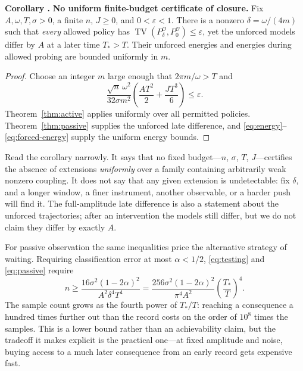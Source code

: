\documentclass[10pt]{article}
\newcounter{claim}
\newcommand{\claim}[2]{\refstepcounter{claim}\label{#1}\textbf{#2 \theclaim.}}
\newcommand{\TV}{\operatorname{TV}}
\newcommand{\eps}{\varepsilon}
\newcommand{\obs}{\mathcal O}
\begin{document}
\begin{resultbox}
\claim{cor:closure}{Corollary} \textbf{No uniform finite-budget certificate of closure.}
Fix $A,\omega,T,\sigma>0$, a finite $n$, $J\geq0$, and $0<\eps<1$.
There is a nonzero $\delta=\omega/(4m)$ such that \emph{every} allowed policy
has $\TV(P_\delta^{\obs},P_0^{\obs})\leq\eps$, yet the unforced models differ
by $A$ at a later time $T_*>T$. Their unforced energies and energies during
allowed probing are bounded uniformly in $m$.
\end{resultbox}
\begin{proof}
Choose an integer $m$ large enough that $2\pi m/\omega>T$ and
\[
\frac{\sqrt n\,\omega^2}{32\sigma m^2}
\left(\frac{AT^2}{2}+\frac{JT^3}{6}\right)\leq\eps.
\]
Theorem~\ref{thm:active} applies uniformly over all permitted policies.
Theorem~\ref{thm:passive} supplies the unforced late difference, and
\eqref{eq:energy}--\eqref{eq:forced-energy} supply the uniform energy bounds.
\end{proof}

Read the corollary narrowly. It says that no fixed budget---$n$, $\sigma$,
$T$, $J$---certifies the absence of extensions \emph{uniformly} over a family
containing arbitrarily weak nonzero coupling. It does not say that any given
extension is undetectable: fix $\delta$, and a longer window, a finer
instrument, another observable, or a harder push will find it. The
full-amplitude late difference is also a statement about the unforced
trajectories; after an intervention the models still differ, but we do not claim
they differ by exactly $A$.

For passive observation the same inequalities price the alternative strategy of
waiting. Requiring classification error at most $\alpha<1/2$,
\eqref{eq:testing} and \eqref{eq:passive} require
\begin{equation}
n\geq\frac{16\sigma^2(1-2\alpha)^2}{A^2\delta^4T^4}
=\frac{256\sigma^2(1-2\alpha)^2}{\pi^4A^2}
\left(\frac{T_*}{T}\right)^4.
\label{eq:sample-cost}
\end{equation}
The sample count grows as the fourth power of $T_*/T$: reaching a consequence
a hundred times further out than the record costs on the order of $10^8$ times
the samples. This is a lower bound rather than an achievability claim, but the
tradeoff it makes explicit is the practical one---at fixed amplitude and noise,
buying access to a much later consequence from an early record gets expensive
fast.
\end{document}
